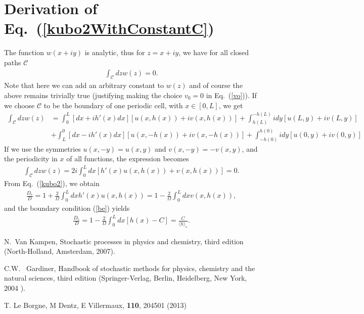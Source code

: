 \documentclass[pre,showpacs,preprintnumbers,amsmath,amssymb,superscriptaddress]{revtex4-1}
\begin{document}
{{\appendix
\section{Derivation of Eq.~(\ref{kubo2WithConstantC})}
\label{AppendixConstantC}

The function $w(x+iy)$ is analytic, thus for $z=x+iy$, we have for all closed paths $\mathcal{C}$
\begin{align}
\int_\mathcal{C} dz w(z) =0.
\end{align}
Note that here we can add an arbitrary constant to $w(z)$ and of course the above remains trivially true (justifying making the choice $v_0=0$ in Eq.~(\ref{vo})). If we choose $\mathcal{C}$ to be the boundary of one periodic cell, with $x \in [0,L]$, we get
\begin{align}
\int_\mathcal{C} dz w(z) &= \int_0^L [dx + i h'(x) dx] [u(x,h(x))+iv(x,h(x))] + \int_{h(L)}^{-h(L)} idy [u(L,y) + i v(L,y)] \nonumber \\
&+ \int_L^0 [dx - i h'(x) dx] [u(x,-h(x))+iv(x,-h(x))] + \int_{-h(0)}^{h(0)} idy [u(0,y) + i v(0,y)]
\end{align}
If we use the symmetries $u(x,-y) = u(x,y)$ and $v(x,-y) = -v(x,y)$, and the periodicity in $x$ of all functions, the expression becomes
\begin{align}
\int_\mathcal{C} dz w(z)= 2 i \int_0^L dx [h'(x) u(x,h(x)) + v(x,h(x))]=0.
\end{align}
From  Eq.~(\ref{kubo2}), we obtain
\begin{align}
\frac{D_e}{D}= 1+ \frac{2}{\Omega} \int_0^L dx h'(x) u(x,h(x)) = 1- \frac{2}{\Omega} \int_0^L dx v(x,h(x)),
\end{align}
and the boundary condition (\ref{be}) yields
\begin{align}
\frac{D_e}{D}= 1- \frac{2}{\Omega} \int_0^L dx [h(x) - C] = \frac{C}{\langle h \rangle_s}.
\end{align}


\begin{thebibliography}{10}

 N.~Van Kampen, Stochastic processes in physics and chemistry, third edition (North-Holland, Amsterdam, 2007).

 C.W.~ Gardiner, Handbook of stochastic methods for physics, chemistry and the natural sciences, third edition (Springer-Verlag, Berlin, Heidelberg, New York, 2004 ).

 T. Le Borgne, M Dentz, E Villermaux, {\bf 110}, 204501 (2013)


\end{thebibliography}}}
\end{document}
